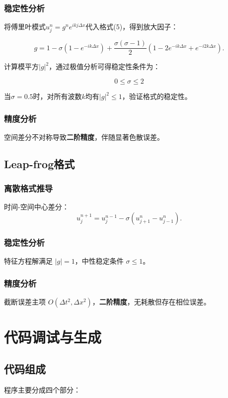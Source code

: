 \documentclass[UTF8]{ctexart}
\begin{document}
\subsubsection{稳定性分析}

将傅里叶模式$u_j^n = g^n e^{ikj\Delta x}$代入格式(5)，得到放大因子：

\begin{equation}
g=1-\sigma\left(1-e^{-i k\Delta x}\right)+\frac{\sigma(\sigma-1)}{2}\left(1-2 e^{-i k\Delta x}+e^{-i 2 k\Delta x}\right). 
\end{equation}

计算模平方$|g|^2$，通过极值分析可得稳定性条件为：

$$
0 \leq \sigma \leq 2
$$

当$\sigma=0.5$时，对所有波数$k$均有$|g|^2 \leq 1$，验证格式的稳定性。

\subsubsection{精度分析}
空间差分不对称导致\textbf{二阶精度}，伴随显著色散误差。

\subsection{Leap-frog格式}
\subsubsection{离散格式推导}
时间-空间中心差分：
\begin{equation}
u_j^{n+1} = u_j^{n-1} - \sigma(u_{j+1}^n - u_{j-1}^n).
\end{equation}

\subsubsection{稳定性分析}
特征方程解满足 $|g| = 1$，中性稳定条件 $\sigma \leq 1$。

\subsubsection{精度分析}
截断误差主项 $O(\Delta t^2, \Delta x^2)$，\textbf{二阶精度}，无耗散但存在相位误差。


\newpage
\section{代码调试与生成}
\subsection{代码组成}
程序主要分成四个部分：
\end{document}
